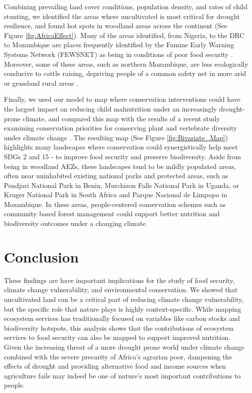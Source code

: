 \documentclass{article}
\begin{document}
Combining prevailing land cover conditions, population density, and rates of child stunting, we identified the areas where uncultivated is most critical for drought resilience, and found hot spots in woodland areas across the continent (See Figure \ref{fig:AfricaEffect}).  Many of the areas identified, from Nigeria, to the DRC to Mozambique are places frequently identified by the Famine Early Warning Systems Network (FEWSNET) as being in conditions of poor food security \cite{FEWSNET2017, FEWSNET2018, FEWSNET2020}.  Moreover, some of these areas, such as northern Mozambique, are less ecologically conducive to cattle raising, depriving people of a common safety net in more arid or grassland rural areas \cite{mabiso2014food}.

Finally, we used our model to map where conservation interventions could have the largest impact on reducing child malnutrition under an increasingly drought-prone climate, and compared this map with the results of a recent study examining conservation priorities for conserving plant and vertebrate diversity under climate change \cite{hannah2020}.  The resulting map (See Figure \ref{fig:Bivariate_Map}) highlights many landscapes where conservation could synergistically help meet SDGs 2 and 15 - to improve food security and preserve biodiversity.  Aside from being in woodland AEZs, these landscapes tend to be mildly populated areas, often near uninhabited existing national parks and protected areas, such as Pendjari National Park in Benin, Murchison Falls National Park in Uganda, or Kruger National Park in South Africa and Parque Nacional de Limpopo in Mozambique.  In these areas, people-centered conservation schemes such as community based forest management could support better nutrition and biodiversity outcomes under a changing climate.

\section{Conclusion}
These findings are have important implications for the study of food security, climate change vulnerability, and environmental conservation.  We showed that uncultivated land can be a critical part of reducing climate change vulnerability, but the specific role that nature plays is highly context-specific.  While mapping ecosystem services has traditionally focused on variables like carbon stocks and biodiversity hotspots, this analysis shows that the contributions of ecosystem services to food security can also be mapped to support improved nutrition.  Given the increasing threat of a more drought prone world under climate change \cite{Dai2013} combined with the severe precarity of Africa's agrarian poor, dampening the effects of drought and providing alternative food and income sources when agriculture fails may indeed be one of nature's most important contributions to people.
\end{document}
